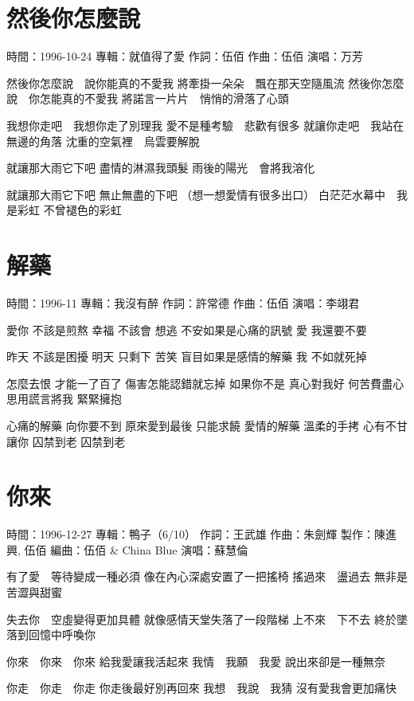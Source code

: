\documentclass[UTF8,a4paper,oneside,twocolumn,12pt]{ctexbook}
\newcommand{\infopair}[2]{\textbullet #1：#2}
\newcommand{\zc}[1][伍佰]{\infopair{作詞}{#1}}
\newcommand{\zq}[1][伍佰]{\infopair{作曲}{#1}}
\newcommand{\bq}[1][伍佰]{\infopair{編曲}{#1}}
\newcommand{\zj}[1]{\infopair{專輯}{#1}}
\newcommand{\zz}[1]{\infopair{製作}{#1}}
\newcommand{\sj}[1]{\infopair{時間}{#1}}
\newenvironment{info}{\begin{flushleft}\kaishu
	}
	{\end{flushleft}\normalsize\yahei\par}
\newenvironment{lyric}{
	}
{}
\begin{document}
\section{然後你怎麼說}
\begin{info}
	\sj{1996-10-24}
	\zj{就值得了愛}
	\zc
	\zq
	\infopair{演唱}{万芳}
\end{info}
\begin{lyric}
	然後你怎麼說　說你能真的不愛我
	將牽掛一朵朵　飄在那天空隨風流
	然後你怎麼說　你怎能真的不愛我
	將諾言一片片　悄悄的滑落了心頭

	我想你走吧　我想你走了別理我
	愛不是種考驗　悲歡有很多
	就讓你走吧　我站在無邊的角落
	沈重的空氣裡　烏雲要解脫

	就讓那大雨它下吧
	盡情的淋濕我頭髮
	雨後的陽光　會將我溶化

	就讓那大雨它下吧
	無止無盡的下吧
	（想一想愛情有很多出口）
	白茫茫水幕中　我是彩虹
	不曾褪色的彩虹
\end{lyric}

\section{解藥}
\begin{info}
	\sj{1996-11}
	\zj{我沒有醉}
	\zc[許常德]
	\zq
	\infopair{演唱}{李翊君}
\end{info}
\begin{lyric}
	愛你 不該是煎熬 幸福 不該會 想逃
	不安如果是心痛的訊號 愛 我還要不要

	昨天 不該是困擾 明天 只剩下 苦笑
	盲目如果是感情的解藥 我 不如就死掉

	怎麼去恨 才能一了百了 傷害怎能認錯就忘掉
	如果你不是 真心對我好 何苦費盡心思用謊言將我 緊緊擁抱

	心痛的解藥 向你要不到 原來愛到最後 只能求饒
	愛情的解藥 溫柔的手拷 心有不甘讓你 囚禁到老 囚禁到老
\end{lyric}

\section{你來}
\begin{info}
	\sj{1996-12-27}
	\zj{鴨子（6/10）}
	\zc[王武雄]
	\zq[朱劍輝]
	\zz{陳進興, 伍佰}
	\bq[伍佰 \& China Blue]
	\infopair{演唱}{蘇慧倫}
\end{info}
\begin{lyric}
	有了愛　等待變成一種必須
	像在內心深處安置了一把搖椅
	搖過來　盪過去
	無非是苦澀與甜蜜

	失去你　空虛變得更加具體
	就像感情天堂失落了一段階梯
	上不來　下不去
	終於墜落到回憶中呼喚你

	你來　你來　你來
	給我愛讓我活起來
	我情　我願　我愛
	說出來卻是一種無奈

	你走　你走　你走
	你走後最好別再回來
	我想　我說　我猜
	沒有愛我會更加痛快
\end{lyric}
\end{document}
